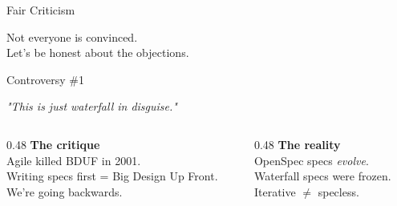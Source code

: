 \documentclass[aspectratio=169,18pt]{beamer}
\begin{document}

\begin{frame}{Fair Criticism}
  \vspace{1.5em}
  \begin{center}
    \Large Not everyone is convinced.\\[1em]
    \normalsize Let's be honest about the objections.
  \end{center}
\end{frame}

\begin{frame}{Controversy \#1}
  \vspace{0.5em}
  \begin{center}
    \large\textit{"This is just waterfall in disguise."}
  \end{center}
  \vspace{0.8em}
  \begin{columns}[T]
    \begin{column}{0.48\textwidth}
      \textbf{\color{openred}The critique}\\[0.4em]
      \small Agile killed BDUF in 2001.\\
      Writing specs first = Big Design Up Front.\\
      We're going backwards.
    \end{column}
    \begin{column}{0.48\textwidth}
      \textbf{\color{opengreen}The reality}\\[0.4em]
      \small OpenSpec specs \textit{evolve}.\\
      Waterfall specs were frozen.\\
      Iterative $\neq$ specless.
    \end{column}
  \end{columns}
\end{frame}
\end{document}
